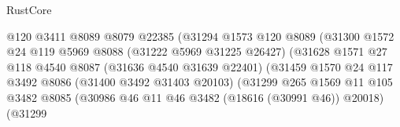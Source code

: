 \begin{lexlean}{RustCore}
\begin{coremodule}
                                            @120
                                            @3411
                                            @8089
                                            @8079
                                            @22385
                                            (@31294
                                              @1573
                                              @120
                                              @8089
                                              (@31300
                                                @1572
                                                @24
                                                @119
                                                @5969
                                                @8088
                                                (@31222 @5969 @31225 @26427)
                                                (@31628
                                                  @1571
                                                  @27
                                                  @118
                                                  @4540
                                                  @8087
                                                  (@31636 @4540 @31639 @22401)
                                                  (@31459
                                                    @1570
                                                    @24
                                                    @117
                                                    @3492
                                                    @8086
                                                    (@31400 @3492 @31403 @20103)
                                                    (@31299
                                                      @265
                                                      @1569
                                                      @11
                                                      @105
                                                      @3482
                                                      @8085
                                                      (@30986
                                                        @46
                                                        @11
                                                        @46
                                                        @3482
                                                        (@18616 (@30991 @46))
                                                        @20018)
                                                      (@31299

\end{coremodule}
\end{lexlean}
